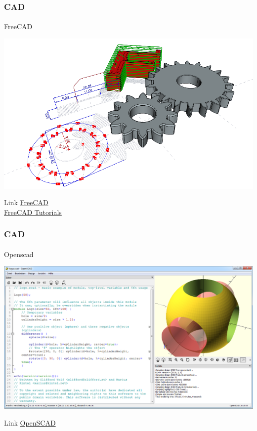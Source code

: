 \documentclass{beamer}
\begin{document}
\begin{frame}
    \frametitle{CAD}
\framesubtitle{}
    \begin{block}{FreeCAD}
\begin{center}
\includegraphics[scale=0.25]{images/freecad}
\end{center}
\end{block}

\begin{block}{Link}
\href{https://www.freecadweb.org/}{FreeCAD} \\
\href{https://wiki.freecadweb.org/Tutorials/}{FreeCAD Tutorials}

\end{block}

\end{frame}



\begin{frame}
    \frametitle{CAD}
\framesubtitle{}
    \begin{block}{Openscad}
\begin{center}
\includegraphics[scale=0.15]{images/Openscad}
\end{center}
\end{block}

\begin{block}{Link}
\href{https://openscad.org/}{OpenSCAD}


\end{block}

\end{frame}
\end{document}
